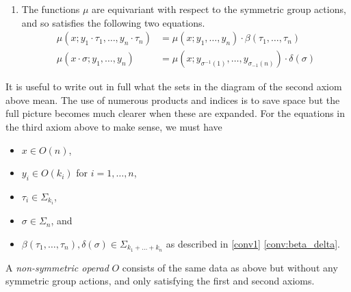 \begin{Defi}
\begin{enumerate}
\item The functions $\mu$ are equivariant with respect to the symmetric group actions, and so satisfies the following two equations.
  \begin{align*}
    \mu(x;y_1 \cdot \tau_1,\ldots,y_n \cdot \tau_n) &= \mu(x;y_1,\ldots,y_n)\cdot \beta(\tau_1,\ldots,\tau_n)\\
    \mu(x \cdot \sigma; y_1, \ldots, y_n) &= \mu\left(x;y_{\sigma^{-1}(1)},\ldots,y_{\sigma_{-1}(n)}\right)\cdot \delta(\sigma)
  \end{align*}
\end{enumerate}
\end{Defi}

\begin{rem}\label{Rem:sigma_conditions}
It is useful to write out in full what the sets in the diagram of the second axiom above mean. The use of numerous products and indices is to save space but the full picture becomes much clearer when these are expanded. For the equations in the third axiom above to make sense, we must have
\begin{itemize}
\item $x \in O(n)$,
\item $y_{i} \in O(k_{i})$ for $i=1, \ldots, n$,
\item $\tau_{i} \in \Sigma_{k_{i}}$,
\item $\sigma \in \Sigma_{n}$, and
\item $\beta(\tau_1,\ldots,\tau_n), \delta(\sigma) \in \Sigma_{k_1 + \ldots + k_n}$ as described in \cref{conv1} \eqref{conv:beta_delta}.
\end{itemize}

\end{rem}
\begin{Defi}
A \emph{non-symmetric operad} $O$ consists of the same data as above but without any symmetric group actions, and only satisfying the first and second axioms.
\end{Defi}

